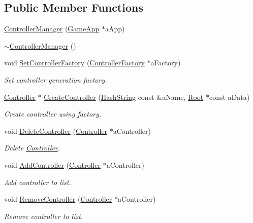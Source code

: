 \subsection*{Public Member Functions}
\begin{DoxyCompactItemize}
\item 
\hyperlink{classControllerManager_afbcc4b48ba1c60d6a45f1c60872fbb5a}{Controller\+Manager} (\hyperlink{classGameApp}{Game\+App} $\ast$a\+App)
\item 
\hyperlink{classControllerManager_a2907bd660f1a870b6d50aa07fdf745d9}{$\sim$\+Controller\+Manager} ()
\item 
void \hyperlink{classControllerManager_a17a74c217d781daa8918c8e03a918972}{Set\+Controller\+Factory} (\hyperlink{classControllerFactory}{Controller\+Factory} $\ast$a\+Factory)
\begin{DoxyCompactList}\small\item\em Set controller generation factory. \end{DoxyCompactList}\item 
\hyperlink{classController}{Controller} $\ast$ \hyperlink{classControllerManager_aa7d5ca87284281477e176fc900419555}{Create\+Controller} (\hyperlink{classHashString}{Hash\+String} const \&a\+Name, \hyperlink{classRoot}{Root} $\ast$const a\+Data)
\begin{DoxyCompactList}\small\item\em Create controller using factory. \end{DoxyCompactList}\item 
void \hyperlink{classControllerManager_acc350f0f5a4fad8f9a66ad0517021569}{Delete\+Controller} (\hyperlink{classController}{Controller} $\ast$a\+Controller)
\begin{DoxyCompactList}\small\item\em Delete \hyperlink{classController}{Controller}. \end{DoxyCompactList}\item 
void \hyperlink{classControllerManager_a67315a3c6e3987dd2c05fcdcbaaf40d2}{Add\+Controller} (\hyperlink{classController}{Controller} $\ast$a\+Controller)
\begin{DoxyCompactList}\small\item\em Add controller to list. \end{DoxyCompactList}\item 
void \hyperlink{classControllerManager_a2e79608055b7faae43fc67fe3e52dd98}{Remove\+Controller} (\hyperlink{classController}{Controller} $\ast$a\+Controller)
\begin{DoxyCompactList}\small\item\em Remove controller to list. \end{DoxyCompactList}\item 

\end{DoxyCompactItemize}
